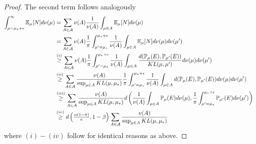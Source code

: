 \begin{proof}
The second term follows analogously
\begin{align*}
\int_{\mu=\mu_*+\epsilon}^\infty \mathbb{E}_\mu[N] d\nu(\mu) &= \sum_{A \in \mathcal{A}} \nu(A) \frac{1}{\nu(A)} \int_{\mu \in A} \mathbb{E}_\mu[N] d\nu(\mu) \\
&= \sum_{A \in \mathcal{A}} \nu(A) \frac{1}{\pi}\int_{\mu' =\mu_*}^{\mu_* + \epsilon} \frac{1}{\nu(A)} \int_{\mu \in A} \mathbb{E}_\mu[N] d\nu(\mu) d\nu(\mu')\\
&\overset{(i)}{\geq} \sum_{A \in \mathcal{A}} \nu(A)\frac{1}{\pi}\int_{\mu' =\mu_*}^{\mu_* + \epsilon} \frac{1}{\nu(A)} \int_{\mu \in A} \frac{d( \mathbb{P}_\mu(E), \mathbb{P}_{\mu'}(E) )}{KL(\mu,\mu')}  d\nu(\mu) d\nu(\mu') \\
&\overset{(ii)}{\geq} \sum_{A \in \mathcal{A}}  \frac{\nu(A)}{\sup_{\mu \in A} KL(\mu,\mu_*)} \frac{1}{\pi}\int_{\mu' =\mu_*}^{\mu_* + \epsilon}\frac{1}{\nu(A)} \int_{\mu \in A} d( \mathbb{P}_\mu(E), \mathbb{P}_{\mu'}(E) )  d\nu(\mu) d\nu(\mu') \\
&\overset{(iii)}{\geq} \sum_{A \in \mathcal{A}} \frac{\nu(A)}{\sup_{\mu \in A} KL(\mu,\mu_*)} d\left( \frac{1}{\nu(A)}\int_{\mu \in A}  \mathbb{P}_\mu(E) d\nu(\mu) , \frac{1}{\pi}\int_{\mu' =\mu_*}^{\mu_* + \epsilon} \mathbb{P}_{\mu'}(E) d\nu(\mu')\right)  \\
&\overset{(iv)}{\geq} d\left( \tfrac{\alpha(1-\pi)}{\kappa} , 1-\beta \right) \sum_{A \in \mathcal{A}}  \frac{\nu(A)}{\sup_{\mu \in A} KL(\mu,\mu_*)}  
\end{align*}
where $(i)-(iv)$ follow for identical reasons as above.


\end{proof}
